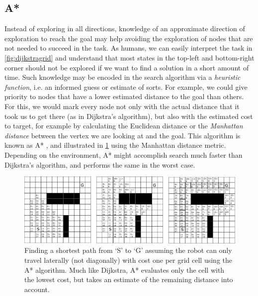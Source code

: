 \subsection{A*}\label{sec:astar}

Instead of exploring in all directions, knowledge of an approximate direction of exploration to reach the goal may help avoiding the exploration of nodes that are not needed to succeed in the task.
As humans, we can easily interpret the task in \cref{fig:dijkstragrid} and understand that most states in the top-left and bottom-right corner should not be explored if we want to find a solution in a short amount of time.
Such knowledge may be encoded in the search algorithm via a \textsl{heuristic function}, i.e. an informed guess or estimate of sorts. For example, we could give priority to nodes that have a lower estimated distance to the goal than others.
For this, we would mark every node not only with the actual distance that it took us to get there (as in Dijkstra's algorithm), but also with the estimated cost to target, for example by calculating the Euclidean distance or the \textsl{Manhattan distance} between the vertex we are looking at and the goal.
This algorithm is known as A* \cite{hart1968formal}, and illustrated in \cref{fig:astargrid} using the Manhattan distance metric. Depending on the environment, A* might accomplish search much faster than Dijkstra's algorithm, and performs the same in the worst case.


\begin{figure}
    \centering
    \includegraphics[width=\textwidth]{figs/astargrid.pdf}
    \caption{Finding a shortest path from `S' to `G' assuming the robot can only travel laterally (not diagonally) with cost one per grid cell using the A* algorithm. Much like Dijkstra, A* evaluates only the cell with the lowest cost, but takes an estimate of the remaining distance into account.\label{fig:astargrid}}
\end{figure}

